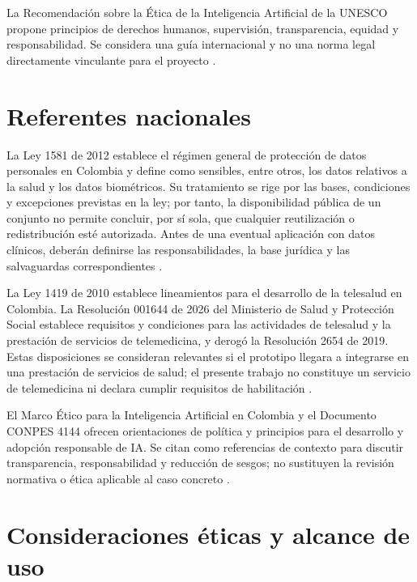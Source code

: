 La Recomendación sobre la Ética de la Inteligencia Artificial de la UNESCO propone principios de derechos humanos, supervisión, transparencia, equidad y responsabilidad. Se considera una guía internacional y no una norma legal directamente vinculante para el proyecto \parencite{unesco2021eticaia}.

\section{Referentes nacionales}
{}

La Ley 1581 de 2012 establece el régimen general de protección de datos personales en Colombia y define como sensibles, entre otros, los datos relativos a la salud y los datos biométricos. Su tratamiento se rige por las bases, condiciones y excepciones previstas en la ley; por tanto, la disponibilidad pública de un conjunto no permite concluir, por sí sola, que cualquier reutilización o redistribución esté autorizada. Antes de una eventual aplicación con datos clínicos, deberán definirse las responsabilidades, la base jurídica y las salvaguardas correspondientes \parencite{colombia2012ley1581}.

La Ley 1419 de 2010 establece lineamientos para el desarrollo de la telesalud en Colombia. La Resolución 001644 de 2026 del Ministerio de Salud y Protección Social establece requisitos y condiciones para las actividades de telesalud y la prestación de servicios de telemedicina, y derogó la Resolución 2654 de 2019. Estas disposiciones se consideran relevantes si el prototipo llegara a integrarse en una prestación de servicios de salud; el presente trabajo no constituye un servicio de telemedicina ni declara cumplir requisitos de habilitación \parencite{colombia2010ley1419,minsalud2026resolucion1644}.

El Marco Ético para la Inteligencia Artificial en Colombia y el Documento CONPES 4144 ofrecen orientaciones de política y principios para el desarrollo y adopción responsable de IA. Se citan como referencias de contexto para discutir transparencia, responsabilidad y reducción de sesgos; no sustituyen la revisión normativa o ética aplicable al caso concreto \parencite{minciencias2021marcoetico,dnp2025conpes4144}.

\section{Consideraciones éticas y alcance de uso}
{}


